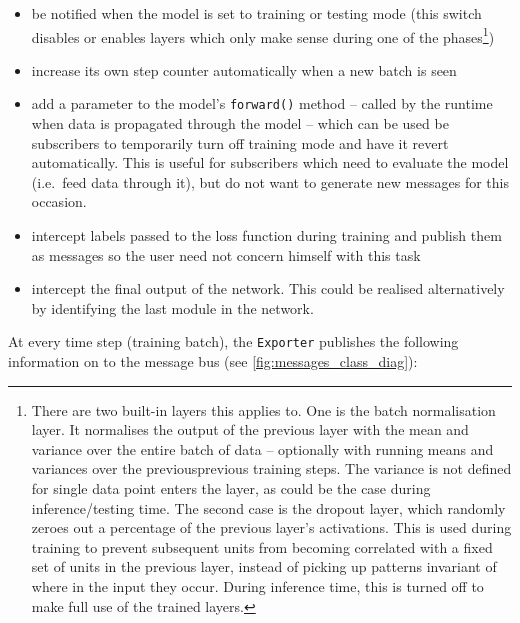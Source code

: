 \begin{itemize}
    \item
        be notified when the model is set to training or testing mode (this
        switch disables or enables layers which only make sense during one of
        the phases\footnote{There are two built-in layers this applies to. One
            is the batch normalisation layer. It normalises the output of the
            previous layer with the mean and variance over the entire batch of
            data -- optionally with running means and variances over the
            previousprevious training steps. The variance is not defined for
            single data point enters the layer, as could be the case during
            inference/testing time. The second case is the dropout layer, which
            randomly zeroes out a percentage of the previous layer's
            activations. This is used during training to prevent subsequent
            units from becoming correlated with a fixed set of units in the
            previous layer, instead of picking up patterns invariant of where in
            the input they occur. During inference time, this is turned off to
            make full use of the trained
        layers.})
    \item
        increase its own step counter automatically when a new batch is seen
    \item
        add a parameter to the model's \lstinline{forward()} method -- called by
        the runtime when data is propagated through the model -- which can be
        used be subscribers to temporarily turn off training mode and have it
        revert automatically. This is useful for subscribers which need to
        evaluate the model (i.e.~feed data through it), but do not want to
        generate new messages for this occasion.
    \item
        intercept labels passed to the loss function during training and
        publish them as messages so the user need not concern himself with
        this task
    \item
        intercept the final output of the network. This could be realised
        alternatively by identifying the last module in the network.
\end{itemize}

At every time step (training batch), the \texttt{Exporter} publishes the
following information on to the message bus (see \cref{fig:messages_class_diag}):

